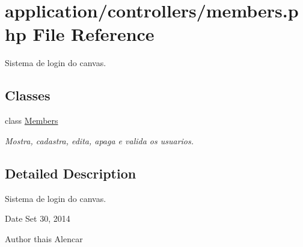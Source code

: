 \hypertarget{members_8php}{\section{application/controllers/members.php File Reference}
\label{members_8php}
}


Sistema de login do canvas.  


\subsection*{Classes}
\begin{DoxyCompactItemize}
\item 
class \hyperlink{classMembers}{Members}
\begin{DoxyCompactList}\small\item\em Mostra, cadastra, edita, apaga e valida os usuarios. \end{DoxyCompactList}\end{DoxyCompactItemize}


\subsection{Detailed Description}
Sistema de login do canvas. \begin{DoxyDate}{Date}
Set 30, 2014 
\end{DoxyDate}
\begin{DoxyAuthor}{Author}
thais Alencar 
\end{DoxyAuthor}

